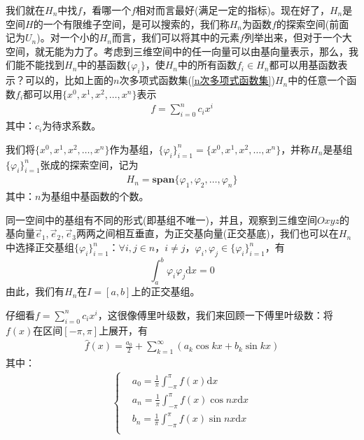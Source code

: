             我们就在$H_n$中找$f$，看哪一个$f$相对而言最好(满足一定的指标)。现在好了，$H_n$是空间$H$的一个有限维子空间，是可以搜索的，我们称$H_n$为函数$f$的探索空间(前面记为$U_n$)。对一个小的$H_n$而言，我们可以将其中的元素$f$列举出来，但对于一个大空间，就无能为力了。考虑到三维空间中的任一向量可以由基向量表示，那么，我们能不能找到$H_n$中的基函数$\{\varphi_i\}$，使$H_n$中的所有函数$f_i\in H_n$都可以用基函数表示？可以的，比如上面的$n$次多项式函数集(\ref{n次多项式函数集})$H_n$中的任意一个函数$f_i$都可以用$\{x^0,x^1,x^2,\dots,x^n\}$表示
            \begin{align*}
                f = \sum_{i = 0}^n c_ix^i
            \end{align*}
            其中：$c_i$为待求系数。
            \par
            我们将$\{x^0,x^1,x^2,\dots,x^n\}$作为基组，$\{\varphi_i\}_{i = 1}^n = \{x^0,x^1,x^2,\dots,x^n\}$，并称$H_n$是基组$\{\varphi_i\}_{i = 1}^n$张成的探索空间，记为
            \begin{align*}
                H_n = \mathbf{span} \{\varphi_1,\varphi_2,\dots,\varphi_n\}
            \end{align*}
            其中：$n$为基组中基函数的个数。
            \par
            同一空间中的基组有不同的形式(即基组不唯一)，并且，观察到三维空间$Oxyz$的基向量$\vec{e}_1,\vec{e}_2,\vec{e}_3$两两之间相互垂直，为正交基向量(正交基底)，我们也可以在$H_n$中选择正交基组$\{\varphi_i\}_{i = 1}^n$：$\forall i,j \in n$，$i\neq j$，$\varphi_i,\varphi_j\in \{\varphi_i\}_{i = 1}^n$，有
            \[
                \int_a^b \varphi_i\varphi_j \mathrm{d}x = 0
            \]
            由此，我们有$H_n$在$I = [a,b]$上的正交基组。
            \par
            仔细看$f = \sum_{i = 0}^n c_ix^i$，这很像傅里叶级数，我们来回顾一下傅里叶级数：将$f(x)$在区间$[-\pi,\pi]$上展开，有
            \begin{align*}
                \hat{f}(x) = \frac{a_0}{2} + \sum _{k = 1} ^\infty (a_k\cos kx + b_k\sin kx)
            \end{align*}
            其中：
            \begin{align*}
            \left\{
                \begin{aligned}
                    &a_0 = \frac{1}{\pi} \int_{-\pi }^\pi f(x) \mathrm{d}x\\
                    &a_n = \frac{1}{\pi} \int_{-\pi }^\pi f(x) \cos nx \mathrm{d}x\\
                    &b_n = \frac{1}{\pi} \int_{-\pi }^\pi f(x) \sin nx\mathrm{d}x\\
                \end{aligned}
            \right.
            \end{align*}
